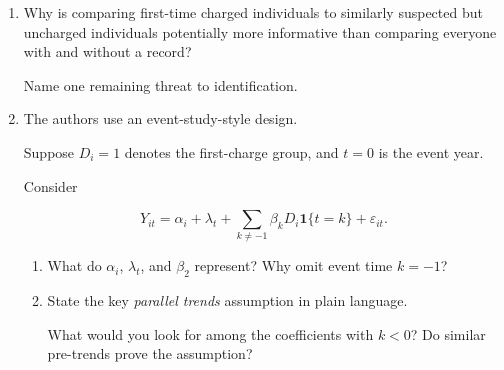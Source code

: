 \documentclass[11pt]{article}
\newif\ifinstructor
\newcommand{\answer}[1]{%
\ifinstructor
\par\smallskip\noindent
{\color{blue!55!black}\small
\textbf{Suggested answer:} #1}
\par
\fi
}
\begin{document}
\begin{enumerate}[resume]

\item Why is comparing first-time charged individuals to similarly
suspected but uncharged individuals potentially more informative
than comparing everyone with and without a record?

Name one remaining threat to identification.

\answer{
Both groups experienced police suspicion regarding similar offenses,
which improves comparability and helps account for consequences
of investigation itself.
Remaining concerns include differences in underlying evidence,
offense severity, or concurrent shocks that both determine charging
and change work trajectories.
Matching is not randomized charging.
}
\vspace{3cm}

\item The authors use an event-study-style design.

Suppose $D_i=1$ denotes the first-charge group,
and $t=0$ is the event year.

Consider

\[
Y_{it}
=
\alpha_i+\lambda_t+
\sum_{k\neq -1}
\beta_k D_i\mathbf{1}\{t=k\}
+\varepsilon_{it}.
\]

\begin{enumerate}[label=(\alph*)]

\item What do $\alpha_i$, $\lambda_t$, and $\beta_2$ represent?
Why omit event time $k=-1$?

\answer{
Person fixed effects absorb time-invariant person traits;
year effects absorb common shocks.
$\beta_2$ is the treated-versus-control earnings difference
two event years after the focal event, relative to the gap
in event year $-1$, after the controls.
One event-time coefficient is omitted as the normalization
or reference period.
}
\vspace{3cm}

\item State the key \emph{parallel trends} assumption
in plain language.

What would you look for among the coefficients with $k<0$?
Do similar pre-trends prove the assumption?

\answer{
Absent the first charge or record, the two matched groups'
average labor outcomes would have evolved similarly.
Leads in pre-event years should be near zero, without
systematic trends, though observed pre-trends alone cannot
prove that post-event counterfactual trends would coincide.
}
\vspace{3cm}


\end{enumerate}
\end{enumerate}
\end{document}
